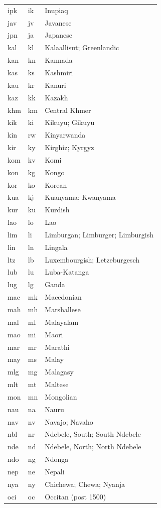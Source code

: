 \begin{longtable}{|L{3cm}|L{3cm}|L{5cm}|}
ipk & ik & Inupiaq\\
jav & jv & Javanese\\
jpn & ja & Japanese\\
kal & kl & Kalaallisut; Greenlandic\\
kan & kn & Kannada\\
kas & ks & Kashmiri\\
kau & kr & Kanuri\\
kaz & kk & Kazakh\\
khm & km & Central Khmer\\
kik & ki & Kikuyu; Gikuyu\\
kin & rw & Kinyarwanda\\
kir & ky & Kirghiz; Kyrgyz\\
kom & kv & Komi\\
kon & kg & Kongo\\
kor & ko & Korean\\
kua & kj & Kuanyama; Kwanyama\\
kur & ku & Kurdish\\
lao & lo & Lao\\
lim & li & Limburgan; Limburger; Limburgish\\
lin & ln & Lingala\\
ltz & lb & Luxembourgish; Letzeburgesch\\
lub & lu & Luba-Katanga\\
lug & lg & Ganda\\
mac & mk & Macedonian\\
mah & mh & Marshallese\\
mal & ml & Malayalam\\
mao & mi & Maori\\
mar & mr & Marathi\\
may & ms & Malay\\
mlg & mg & Malagasy\\
mlt & mt & Maltese\\
mon & mn & Mongolian\\
nau & na & Nauru\\
nav & nv & Navajo; Navaho\\
nbl & nr & Ndebele, South; South Ndebele\\
nde & nd & Ndebele, North; North Ndebele\\
ndo & ng & Ndonga\\
nep & ne & Nepali\\
nya & ny & Chichewa; Chewa; Nyanja\\
oci & oc & Occitan (post 1500)\\

\end{longtable}
